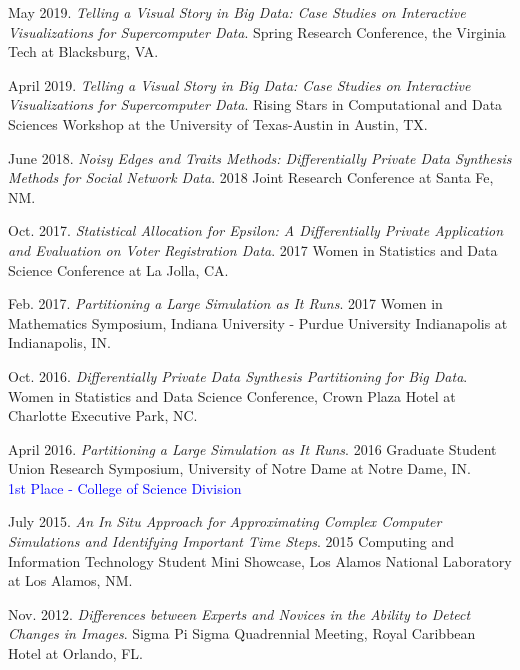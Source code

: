 \documentclass[11pt, letterpaper, roman]{moderncv} %
\begin{document}
\begin{etaremune}[topsep=0pt, itemsep=6pt, partopsep=0pt, parsep=0pt]
    \item May 2019. \textit{Telling a Visual Story in Big Data: Case Studies on Interactive Visualizations for Supercomputer Data}. Spring Research Conference, the Virginia Tech at Blacksburg, VA.
    
    \item April 2019. \textit{Telling a Visual Story in Big Data: Case Studies on Interactive Visualizations for Supercomputer Data}. Rising Stars in Computational and Data Sciences Workshop at the University of Texas-Austin in Austin, TX.
    
    \item June 2018. \textit{Noisy Edges and Traits Methods: Differentially Private Data Synthesis Methods for Social Network Data}. 2018 Joint Research Conference at Santa Fe, NM.
    
    \item Oct. 2017. \textit{Statistical Allocation for Epsilon: A Differentially Private Application and Evaluation on Voter Registration Data}. 2017 Women in Statistics and Data Science Conference at La Jolla, CA.
    
    \item Feb. 2017. \textit{Partitioning a Large Simulation as It Runs}. 2017 Women in Mathematics Symposium, Indiana University - Purdue University Indianapolis at Indianapolis, IN.
    
    \item Oct. 2016. \textit{Differentially Private Data Synthesis Partitioning for Big Data}. Women in Statistics and Data Science Conference, Crown Plaza Hotel at Charlotte Executive Park, NC. 
    
    \item April 2016. \textit{Partitioning a Large Simulation as It Runs}. 2016 Graduate Student Union Research Symposium, University of Notre Dame at Notre Dame, IN.\\
    \textcolor{blue}{1st Place - College of Science Division}
    
    \item July 2015. \textit{An In Situ Approach for Approximating Complex Computer Simulations and Identifying Important Time Steps}. 2015 Computing and Information Technology Student Mini Showcase, Los Alamos National Laboratory at Los Alamos, NM.
    
    \item Nov. 2012. \textit{Differences between Experts and Novices in the Ability to Detect Changes in Images}. Sigma Pi Sigma Quadrennial Meeting, Royal Caribbean Hotel at Orlando, FL.
    

\end{etaremune}
\end{document}
